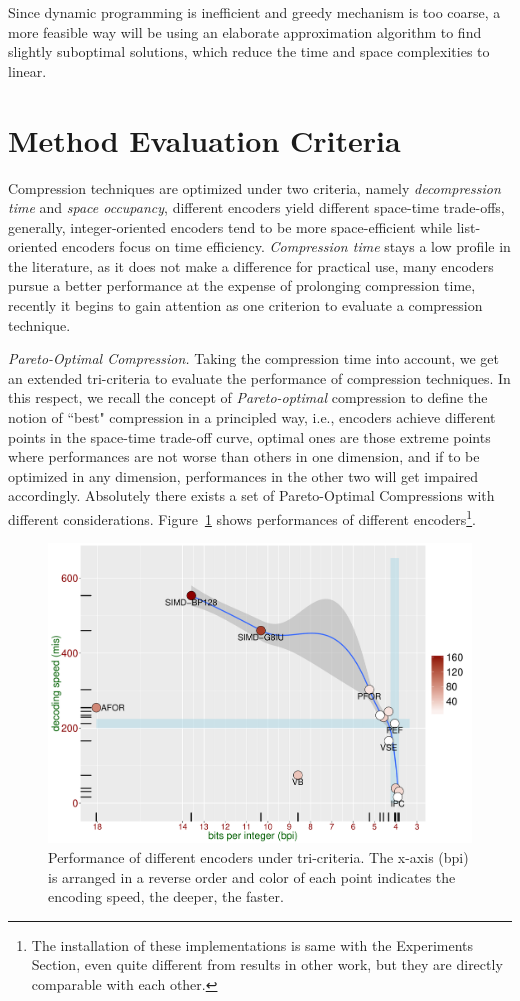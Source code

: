\documentclass[runningheads,a4paper]{llncs}
\begin{document}
Since dynamic programming is inefficient and greedy mechanism is too coarse, a more feasible way will be using an elaborate approximation algorithm to find slightly suboptimal solutions, which reduce the time and space complexities to linear.

\section{Method Evaluation Criteria}
Compression techniques are optimized under two criteria, namely \textit{decompression time} and \textit{space occupancy}, different encoders yield different space-time trade-offs, generally, integer-oriented encoders tend to be more space-efficient while list-oriented encoders focus on time efficiency. \textit{Compression time} stays a low profile in the literature, as it does not make a difference for practical use, many encoders pursue a better performance at the expense of prolonging compression time, recently it begins to gain attention as one criterion to evaluate a compression technique\cite{lemire2015decoding,ottaviano2015optimal}.

\textit{Pareto-Optimal Compression.}
Taking the compression time into account, we get an extended tri-criteria to evaluate the performance of compression techniques. In this respect, we recall the concept of \textit{Pareto-optimal} compression to define the notion of ``best" compression in a principled way, i.e., encoders achieve different points in the space-time trade-off curve, optimal ones are those extreme points where performances are not worse than others in one dimension, and if to be optimized in any dimension, performances in the other two will get impaired accordingly. Absolutely there exists a set of Pareto-Optimal Compressions with different considerations. Figure~\ref{fig:performance} shows performances of different encoders\footnote{The installation of these implementations is same with the Experiments Section, even quite different from results in other work, but they are directly comparable with each other.}.

\begin{figure}
	\centering
	\includegraphics[width=0.7\linewidth]{performance}
	\caption{Performance of different encoders under tri-criteria. The x-axis (bpi) is arranged in a reverse order and color of each point indicates the encoding speed, the deeper, the faster.}
	\label{fig:performance}
\end{figure}
\end{document}
